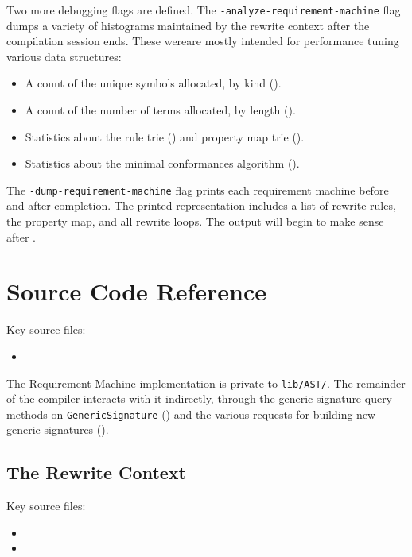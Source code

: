 \documentclass[../generics]{subfiles}
\begin{document}
Two more debugging flags are defined. The \texttt{-analyze-requirement-machine} flag dumps a variety of histograms maintained by the rewrite context after the compilation session ends. These wereare mostly intended for performance tuning various data structures:
\begin{itemize}
\item A count of the unique symbols allocated, by kind ().
\item A count of the number of terms allocated, by length ().
\item Statistics about the rule trie () and property map trie ().
\item Statistics about the minimal conformances algorithm ().
\end{itemize}

The \texttt{-dump-requirement-machine} flag prints each requirement machine before and after completion. The printed representation includes a list of rewrite rules, the property map, and all rewrite loops. The output will begin to make sense after .

\section{Source Code Reference}\label{rqm basic operation source ref}

Key source files:
\begin{itemize}
\item {}
\end{itemize}
The Requirement Machine implementation is private to \texttt{lib/AST/}. The remainder of the compiler interacts with it indirectly, through the generic signature query methods on \texttt{GenericSignature} () and the various requests for building new generic signatures ().

\subsection*{The Rewrite Context}

Key source files:
\begin{itemize}
\item {}
\item {}
\end{itemize}
\end{document}
